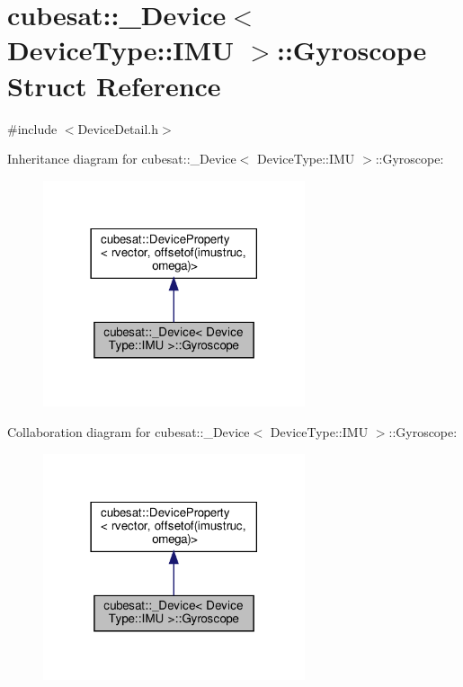 \hypertarget{structcubesat_1_1__Device_3_01DeviceType_1_1IMU_01_4_1_1Gyroscope}{}\section{cubesat\+:\+:\+\_\+\+Device$<$ Device\+Type\+:\+:I\+MU $>$\+:\+:Gyroscope Struct Reference}
\label{structcubesat_1_1__Device_3_01DeviceType_1_1IMU_01_4_1_1Gyroscope}


{\ttfamily \#include $<$Device\+Detail.\+h$>$}



Inheritance diagram for cubesat\+:\+:\+\_\+\+Device$<$ Device\+Type\+:\+:I\+MU $>$\+:\+:Gyroscope\+:\nopagebreak
\begin{figure}[H]
\begin{center}
\leavevmode
\includegraphics[width=218pt]{structcubesat_1_1__Device_3_01DeviceType_1_1IMU_01_4_1_1Gyroscope__inherit__graph}
\end{center}
\end{figure}


Collaboration diagram for cubesat\+:\+:\+\_\+\+Device$<$ Device\+Type\+:\+:I\+MU $>$\+:\+:Gyroscope\+:\nopagebreak
\begin{figure}[H]
\begin{center}
\leavevmode
\includegraphics[width=218pt]{structcubesat_1_1__Device_3_01DeviceType_1_1IMU_01_4_1_1Gyroscope__coll__graph}
\end{center}
\end{figure}
